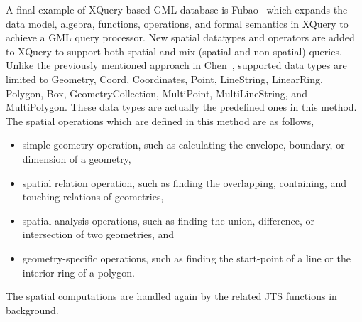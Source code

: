 \documentclass[a4paper,12pt]{article}
\begin{document}
A final example of XQuery-based GML database is Fubao~\cite{Fubao2010}
which expands the data model, algebra, functions, operations, and formal semantics in XQuery 
to achieve a GML query processor. New spatial datatypes and operators are added to XQuery to support both spatial and mix (spatial and non-spatial) queries. Unlike the previously mentioned approach in Chen~\cite{Chen2010}, supported data types are limited to Geometry, Coord, Coordinates, Point, LineString, LinearRing, Polygon, Box, GeometryCollection, MultiPoint, MultiLineString, and MultiPolygon. 
These data types are actually the predefined ones in this method.
The spatial operations which are defined in this method are as follows,
\begin{itemize}
\item simple geometry operation, such as calculating the envelope, boundary, or dimension of a geometry,
\item spatial relation operation, such as finding the overlapping, containing, and touching relations of geometries,
\item spatial analysis operations, such as finding the union, difference, or intersection of two geometries, and
\item geometry-specific operations, such as finding the start-point of a line or the interior ring of a polygon.
\end{itemize}
The spatial computations are handled again by the related JTS functions in background.



\end{document}
